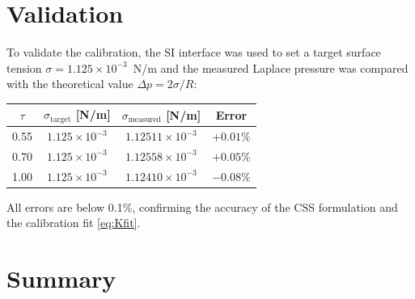 \documentclass[11pt,a4paper]{article}
\begin{document}
\section{Validation}
\label{sec:validation}

To validate the calibration, the SI interface was used to set a target
surface tension $\sigma = 1.125\times10^{-3}$~N/m and the measured
Laplace pressure was compared with the theoretical value
$\Delta p = 2\sigma/R$:

\begin{center}
\begin{tabular}{cccc}
  \toprule
  $\tau$ & $\sigma_{\text{target}}$ [N/m]
         & $\sigma_{\text{measured}}$ [N/m] & Error \\
  \midrule
  0.55 & $1.125\times10^{-3}$ & $1.12511\times10^{-3}$ & $+0.01\%$ \\
  0.70 & $1.125\times10^{-3}$ & $1.12558\times10^{-3}$ & $+0.05\%$ \\
  1.00 & $1.125\times10^{-3}$ & $1.12410\times10^{-3}$ & $-0.08\%$ \\
  \bottomrule
\end{tabular}
\end{center}

All errors are below 0.1\%, confirming the accuracy of the CSS
formulation and the calibration fit \eqref{eq:Kfit}.

\section{Summary}
\label{sec:summary}
\end{document}
